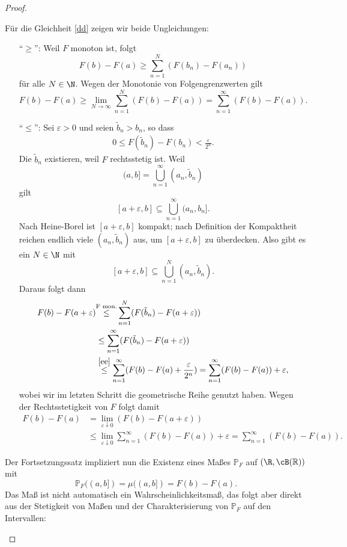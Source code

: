 \begin{proof}
\begin{enumerate}[label=(\roman*)]
		F\"ur die Gleichheit \eqref{dd} zeigen wir beide Ungleichungen:
		\begin{itemize}
			\item [\enquote{$\geq$}:] Weil $F$ monoton ist, folgt \[ F(b) - F(a) \geq \sum\limits_{n=1}^{N} (F(b_n) - F(a_n))\] f\"ur alle $N\in\N$. 
			Wegen der Monotonie von Folgengrenzwerten gilt \[ F(b) - F(a) \geq \lim\limits_{N \to \infty} \sum\limits_{n=1}^{N} (F(b) - F(a)) = \sum\limits_{n=1}^{\infty} (F(b) - F(a)). \]
			\item [\enquote{$\leq$}:] Sei $\varepsilon > 0$ und seien $\tilde{b}_n > b_n$, so dass
			\begin{align}\label{ee}
			 	 0 \leq F(\tilde{b}_n) - F(b_n) < \frac{\varepsilon}{2^n}. 
			\end{align}	
				Die $\tilde{b}_n$ existieren, weil $F$ rechtsstetig ist. Weil \[ (a,b] = \bigcup\limits_{n = 1}^{\infty} (a_n,\tilde{b}_n) \] gilt \[ [a + \varepsilon, b] \subseteq \bigcup\limits_{n = 1}^{\infty} (a_n,b_n]. \] Nach Heine-Borel ist $[a + \varepsilon, b]$ kompakt; nach Definition der Kompaktheit reichen endlich viele $(a_n, \tilde{b}_n)$ aus, um $[a + \varepsilon, b]$ zu überdecken. Also gibt es ein $N\in\N$ mit \[ [a + \varepsilon, b] \subseteq \bigcup\limits_{n = 1}^{N} (a_n, \tilde{b}_n). \] Daraus folgt dann
			\begin{align*}
				F(b) - F(a + \varepsilon) & \overset{\text{F mon.}}{{\leq}}  \sum\limits_{n=1}^{N} (F(\tilde{b}_n) - F(a + \varepsilon))\\ 
				&\leq \sum\limits_{n=1}^{\infty} (F(\tilde{b}_n) - F(a + \varepsilon))\\ 
				&\overset{\eqref{ee}}{\leq} \sum\limits_{n=1}^{\infty} (F(b) - F(a) + \frac{\varepsilon}{2^n}) = \sum\limits_{n=1}^{\infty} (F(b) - F(a)) + \varepsilon,
			\end{align*}
			wobei wir im letzten Schritt die geometrische Reihe genutzt haben. Wegen der Rechtsstetigkeit von $F$ folgt damit
			\begin{align*}			
			  F(b) - F(a) &= \lim\limits_{\varepsilon \downarrow 0} (F(b) - F(a + \varepsilon))\\
			  & \leq \lim\limits_{\varepsilon \downarrow 0} \sum\limits_{n=1}^{\infty} (F(b) - F(a)) + \varepsilon = \sum\limits_{n=1}^{\infty} (F(b) - F(a)).
			\end{align*}			
		\end{itemize}
	Der Fortsetzungssatz impliziert nun die Existenz eines Maßes $\mathbb{P}_F$ auf $(\R,\cB(\mathbb{R}))$ mit \[\mathbb{P}_F((a,b]) = \mu((a,b]) = F(b) - F(a). \] Das Ma\ss{} ist nicht automatisch ein Wahrscheinlichkeitsma\ss, das folgt aber direkt aus der Stetigkeit von Ma\ss en und der Charakterisierung von $\mathbb P_F$ auf den Intervallen:

\end{enumerate}
\end{proof}

